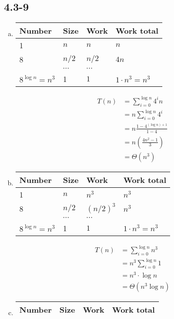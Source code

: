 \documentclass[twocolumn]{article}
\begin{document}
	\subsection*{4.3-9}
	\begin{enumerate}[a.]
		\item 
			\begin{table}[H]
			\begin{tabular}{ll|ll}
				\textbf{Number}&\textbf{Size}&\textbf{Work}&\textbf{Work total}\\ \hline
				1&$n$&$n$&$n$\\ 
				8&$n/2$&$n/2$&$4n$\\
				&$\cdots$&$\cdots$&\\
				$8^{\log n}=n^3$&1&$1$&$1\cdot n^3=n^3$
			\end{tabular}
		\end{table}
		\[
		\begin{aligned}
			T(n)&=\sum_{i=0}^{\log n}4^in\\
			&=n\sum_{i=0}^{\log n}4^i\\
			&=n\frac{1-4^{(\log n)+1}}{1-4}\\
			&=n\left(\frac{4n^2-1}{3}\right)\\
			&=\Theta(n^3)
		\end{aligned}
		\]
		\item 
		\begin{table}[H]
			\begin{tabular}{ll|ll}
				\textbf{Number}&\textbf{Size}&\textbf{Work}&\textbf{Work total}\\ \hline
				1&$n$&$n^3$&$n^3$\\ 
				8&$n/2$&$(n/2)^3$&$n^3$\\
				&$\cdots$&$\cdots$&\\
				$8^{\log n}=n^3$&1&$1$&$1\cdot n^3=n^3$
			\end{tabular}
		\end{table}
		\[
		\begin{aligned}
		T(n)&=\sum_{i=0}^{\log n}n^3\\
		&=n^3\sum_{i=0}^{\log n}1\\
		&=n^3\cdot \log n\\
		&=\Theta(n^3\log n)
		\end{aligned}
		\]
		\item 
			\begin{table}[H]
			\begin{tabular}{ll|ll}
				\textbf{Number}&\textbf{Size}&\textbf{Work}&\textbf{Work total}\\ \hline

\end{tabular}
\end{table}
\end{enumerate}
\end{document}
